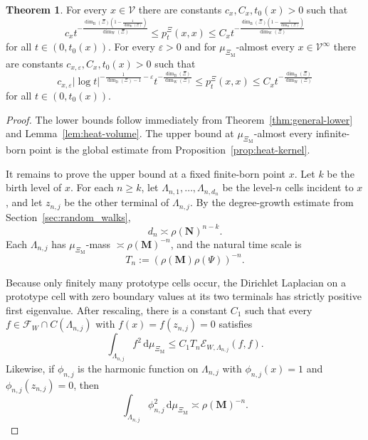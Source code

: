 \documentclass{article}
\theoremstyle{plain}
\theoremstyle{definition}
\newtheorem{theorem}{Theorem}[section]
\newcommand{\dimbox}{\dim_\mathrm{B}}
\newcommand{\dimdeg}{\dim_\mathrm{D}}
\newcommand{\dimwalk}{\dim_\mathrm{W}}
\begin{document}
\begin{theorem}\label{thm:diffusion-heat}
For every $x\in \mathscr V$ there are constants $c_x,C_x,t_0(x)>0$ such that
\[
c_x t^{-\frac{\dimbox(\Xi)\left(1-\frac{1}{\dimdeg(\Xi)}\right)}{\dimwalk(\Xi)}}
\le
p_t^\Xi(x,x)
\le
C_x t^{-\frac{\dimbox(\Xi)\left(1-\frac{1}{\dimdeg(\Xi)}\right)}{\dimwalk(\Xi)}}
\]
for all $t\in(0,t_0(x))$.
For every $\varepsilon>0$ and for $\mu_{\Xi_{\mathrm M}}$-almost every $x\in \mathscr V^\infty$ there are constants $c_{x,\varepsilon},C_x,t_0(x)>0$ such that
\[
c_{x,\varepsilon} |\log t|^{-\frac{1}{\dimdeg(\Xi)-1}-\varepsilon} t^{-\frac{\dimbox(\Xi)}{\dimwalk(\Xi)}}
\le
p_t^\Xi(x,x)
\le
C_x t^{-\frac{\dimbox(\Xi)}{\dimwalk(\Xi)}}
\]
for all $t\in(0,t_0(x))$.
\end{theorem}

\begin{proof}
The lower bounds follow immediately from Theorem~\ref{thm:general-lower} and Lemma~\ref{lem:heat-volume}.
The upper bound at $\mu_{\Xi_{\mathrm M}}$-almost every infinite-born point is the global estimate from Proposition~\ref{prop:heat-kernel}.

It remains to prove the upper bound at a fixed finite-born point $x$.
Let $k$ be the birth level of $x$.
For each $n\ge k$, let $\Lambda_{n,1},\dots,\Lambda_{n,d_n}$ be the level-$n$ cells incident to $x$, and let $z_{n,j}$ be the other terminal of $\Lambda_{n,j}$.
By the degree-growth estimate from Section~\ref{sec:random_walks},
\[
d_n\asymp \rho(\mathbf N)^{n-k}.
\]
Each $\Lambda_{n,j}$ has $\mu_{\Xi_{\mathrm M}}$-mass $\asymp \rho(\mathbf M)^{-n}$, and the natural time scale is
\[
T_n:=(\rho(\mathbf M)\rho(\Psi))^{-n}.
\]

Because only finitely many prototype cells occur, the Dirichlet Laplacian on a prototype cell with zero boundary values at its two terminals has strictly positive first eigenvalue.
After rescaling, there is a constant $C_1$ such that every $f\in \mathcal F_W\cap C(\Lambda_{n,j})$ with $f(x)=f(z_{n,j})=0$ satisfies
\[
\int_{\Lambda_{n,j}}f^2\,\mathrm d\mu_{\Xi_{\mathrm M}}
\le
C_1T_n\mathcal E_{W,\Lambda_{n,j}}(f,f).
\]
Likewise, if $\phi_{n,j}$ is the harmonic function on $\Lambda_{n,j}$ with $\phi_{n,j}(x)=1$ and $\phi_{n,j}(z_{n,j})=0$, then
\[
\int_{\Lambda_{n,j}}\phi_{n,j}^2\,\mathrm d\mu_{\Xi_{\mathrm M}}
\asymp
\rho(\mathbf M)^{-n}.
\]




\end{proof}
\end{document}
